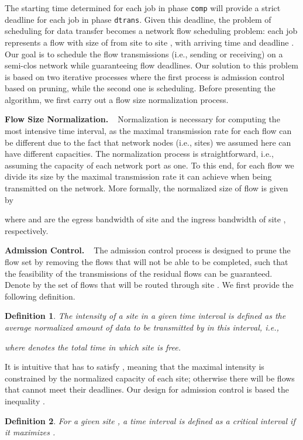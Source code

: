 \documentclass{article}
\newtheorem{definition}{Definition}
\newcommand{\bpara}[2]{\noindent\textbf{#1~~}{#2}}
\begin{document}
The starting time determined for each job in phase \texttt{comp} will provide a strict deadline for each job in phase \texttt{dtrans}. Given this deadline, the problem of scheduling for data transfer becomes a network flow scheduling problem: each job  represents a flow  with size of  from site  to site , with arriving time  and deadline . Our goal is to schedule the flow transmissions (i.e., sending or receiving) on a semi-clos network while guaranteeing flow deadlines. Our solution to this problem is based on two iterative processes where the first process is admission control based on pruning, while the second one is scheduling. Before presenting the algorithm, we first carry out a flow size normalization process. 

\bpara{Flow Size Normalization.}Normalization is necessary for computing the most intensive time interval, as the maximal transmission rate for each flow can be different due to the fact that network nodes (i.e., sites) we assumed here can have different capacities. The normalization process is straightforward, i.e., assuming the capacity of each network port as one. To this end, for each flow we divide its size by the maximal transmission rate it can achieve when being transmitted on the network. More formally, the normalized size of flow  is given by 

where  and  are the egress bandwidth of site  and the ingress bandwidth of site , respectively.

\bpara{Admission Control.}
The admission control process is designed to prune the flow set by removing the flows that will not be able to be completed, such that the feasibility of the transmissions of the residual flows can be guaranteed. Denote by  the set of flows that will be routed through site . We first provide the following definition.
\begin{definition}
The intensity of a site  in a given time interval  is defined as the average normalized amount of data to be transmitted by  in this interval, i.e.,

where  denotes the total time in which site  is free.
\end{definition}

It is intuitive that  has to satisfy , meaning that the maximal intensity is constrained by the normalized capacity of each site; otherwise there will be flows that cannot meet their deadlines. Our design for admission control is based the inequality .

\begin{definition}
For a given site , a time interval  is defined as a critical interval if it maximizes .
\end{definition}
\end{document}
